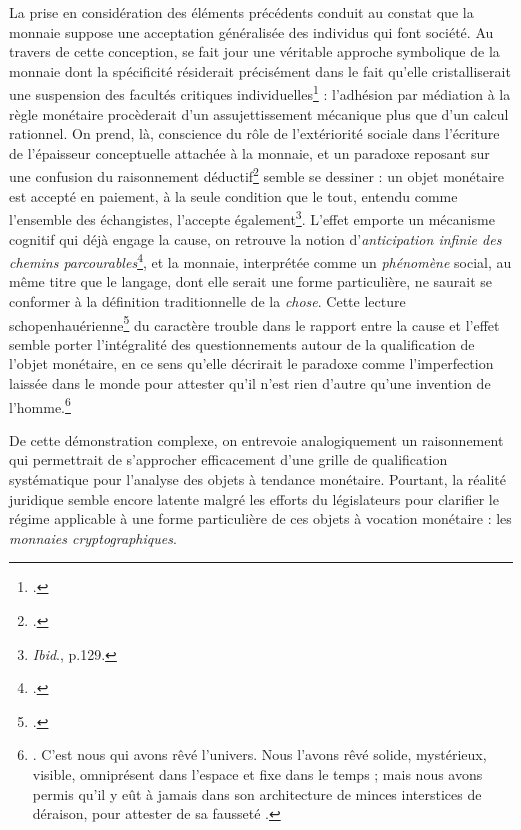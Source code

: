 {La prise en considération des éléments précédents conduit au constat que la monnaie suppose une acceptation généralisée des individus qui font société. Au travers de cette conception, se fait jour une véritable approche symbolique de la monnaie dont la spécificité résiderait précisément dans le fait qu'elle cristalliserait une suspension des facultés critiques individuelles\footnote{.} : l'adhésion par médiation à la règle monétaire procèderait d'un assujettissement mécanique plus que d'un calcul rationnel. On prend, là, conscience du rôle de l'extériorité sociale dans l'écriture de l'épaisseur conceptuelle attachée à la monnaie, et un paradoxe reposant sur une confusion du raisonnement déductif\footnote{.} semble se dessiner : un objet monétaire est accepté en paiement, à la seule condition que le tout, entendu comme l'ensemble des échangistes, l'accepte également\footnote{\emph{Ibid}., p.129.}. L'effet emporte un mécanisme cognitif qui déjà engage la cause, on retrouve la notion d'\emph{anticipation infinie des chemins parcourables}\footnote{.}, et la monnaie, interprétée comme un \emph{phénomène} social, au même titre que le langage, dont elle serait une forme particulière, ne saurait se conformer à la définition traditionnelle de la \emph{chose}. Cette lecture schopenhauérienne\footnote{.} du caractère trouble dans le rapport entre la cause et l'effet semble porter l'intégralité des questionnements autour de la qualification de l'objet monétaire, en ce sens qu'elle décrirait le paradoxe comme l'imperfection laissée dans le monde pour attester qu'il n'est rien d'autre qu'une invention de l'homme.\footnote{. \og C'est nous qui avons rêvé l'univers. Nous l'avons rêvé solide, mystérieux, visible, omniprésent dans l'espace et fixe dans le temps ; mais nous avons permis qu'il y eût à jamais dans son architecture de minces interstices de déraison, pour attester de sa fausseté \fg{}.}\par 
 
De cette démonstration complexe, on entrevoie analogiquement un raisonnement qui permettrait de s'approcher efficacement d'une grille de qualification systématique pour l'analyse des objets à tendance monétaire. Pourtant, la réalité juridique semble encore latente malgré les efforts du législateurs pour clarifier le régime applicable à une forme particulière de ces objets à vocation monétaire : les \emph{monnaies cryptographiques}.\par
 
}
